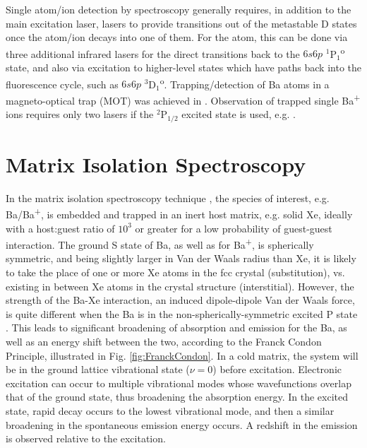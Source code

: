 Single atom/ion detection by spectroscopy generally requires, in addition to the main excitation laser, lasers to provide transitions out of the metastable D states once the atom/ion decays into one of them.  For the atom, this can be done via three additional infrared lasers for the direct transitions back to the $6s6p$ $^{1}$P$_{1}$\textsuperscript{o} state, and also via excitation to higher-level states which have paths back into the fluorescence cycle, such as $6s6p$ $^{3}$D$_{1}$\textsuperscript{o}.  Trapping/detection of Ba atoms in a magneto-optical trap (MOT) was achieved in \cite{BaMOT}.  Observation of trapped single Ba\textsuperscript{+} ions requires only two lasers if the $^{2}$P$_{1/2}$ excited state is used, e.g. \cite{singleBaPlusEXO}.

\section{Matrix Isolation Spectroscopy}


In the matrix isolation spectroscopy technique \cite{matrixIso}, the species of interest, e.g. Ba/Ba\textsuperscript{+}, is embedded and trapped in an inert host matrix, e.g. solid Xe, ideally with a host:guest ratio of $10^{3}$ or greater for a low probability of guest-guest interaction.  The ground S state of Ba, as well as for Ba\textsuperscript{+}, is spherically symmetric, and being slightly larger in Van der Waals radius than Xe, it is likely to take the place of one or more Xe atoms in the fcc crystal (substitution), vs. existing in between Xe atoms in the crystal structure (interstitial).  However, the strength of the Ba-Xe interaction, an induced dipole-dipole Van der Waals force, is quite different when the Ba is in the non-spherically-symmetric excited P state \cite{crepin}.  This leads to significant broadening of absorption and emission for the Ba, as well as an energy shift between the two, according to the Franck Condon Principle, illustrated in Fig. \ref{fig:FranckCondon}.  In a cold matrix, the system will be in the ground lattice vibrational state ($\nu =0$) before excitation.  Electronic excitation can occur to multiple vibrational modes whose wavefunctions overlap that of the ground state, thus broadening the absorption energy.  In the excited state, rapid decay occurs to the lowest vibrational mode, and then a similar broadening in the spontaneous emission energy occurs.  A redshift in the emission is observed relative to the excitation.

